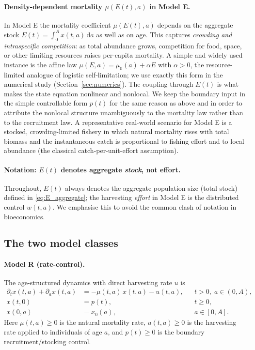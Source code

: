 \documentclass[pdflatex,sn-mathphys-num]{sn-jnl}
\theoremstyle{definition}
\theoremstyle{remark}
\newcommand{\dd}{\,\mathrm{d}}
\begin{document}
\paragraph{Density-dependent mortality $\mu(E(t),a)$ in Model E.}
In Model E the mortality coefficient $\mu(E(t),a)$ depends on the aggregate
stock $E(t)=\int_0^A x(t,a)\dd a$ as well as on age. This captures
\emph{crowding and intraspecific competition}: as total abundance grows,
competition for food, space, or other limiting resources raises per-capita
mortality. A simple and widely used instance is the affine law
$\mu(E,a)=\mu_0(a)+\alpha E$ with $\alpha>0$, the resource-limited analogue
of logistic self-limitation; we use exactly this form in the numerical study
(Section~\ref{sec:numerics}). The coupling through $E(t)$ is what makes the
state equation nonlinear and nonlocal. We keep the boundary input in the
simple controllable form $p(t)$ for the same reason as above and in order to
attribute the nonlocal structure unambiguously to the mortality law rather
than to the recruitment law. A representative real-world scenario for Model
E is a stocked, crowding-limited fishery in which natural mortality rises
with total biomass and the instantaneous catch is proportional to fishing
effort and to local abundance (the classical catch-per-unit-effort
assumption).

\paragraph{Notation: $E(t)$ denotes aggregate \emph{stock}, not effort.}
Throughout, $E(t)$ always denotes the aggregate population size (total
stock) defined in \eqref{eq:E_aggregate}; the harvesting \emph{effort} in
Model E is the distributed control $w(t,a)$. We emphasise this to avoid the
common clash of notation in bioeconomics.


\subsection{The two model classes}

\paragraph{Model R (rate-control).}
The age-structured dynamics with direct harvesting rate $u$ is
\begin{align}
\partial_t x(t,a)+\partial_a x(t,a)
&=-\mu(t,a)\,x(t,a)-u(t,a),
&& t>0,\; a\in(0,A), \label{eq:R_state}\\[2pt]
x(t,0)&=p(t), && t\ge 0, \label{eq:R_bc}\\[2pt]
x(0,a)&=x_0(a), && a\in[0,A]. \label{eq:R_ic}
\end{align}
Here $\mu(t,a)\ge0$ is the natural mortality rate, $u(t,a)\ge0$ is the
harvesting rate applied to individuals of age $a$, and $p(t)\ge0$ is the
boundary recruitment/stocking control.
\end{document}

